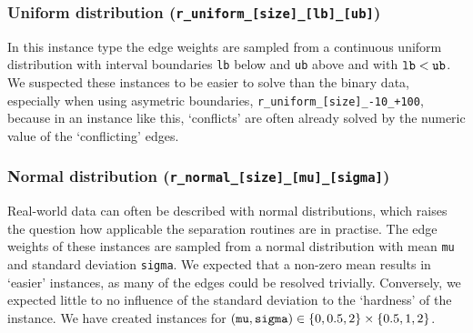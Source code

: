 \subsubsection{Uniform distribution (\texttt{r\_uniform\_[size]\_[lb]\_[ub]})}\label{subsubsec:data_random_uniform}
In this instance type the edge weights are sampled from a continuous uniform distribution with interval boundaries \texttt{lb} below and \texttt{ub} above and with $\text{\texttt{lb}} < \text{\texttt{ub}}$.
We suspected these instances to be easier to solve than the binary data, especially when using asymetric boundaries, \eg \texttt{r\_uniform\_[size]\_-10\_+100}, because in an instance like this, ‘conflicts’ are often already solved by the numeric value of the ‘conflicting’ edges.

\subsubsection{Normal distribution (\texttt{r\_normal\_[size]\_[mu]\_[sigma]})}\label{subsubsec:data_random_normal}
Real-world data can often be described with normal distributions, which raises the question how applicable the separation routines are in practise.
The edge weights of these instances are sampled from a normal distribution with mean \texttt{mu} and standard deviation \texttt{sigma}.
We expected that a non-zero mean results in ‘easier’ instances, as many of the edges could be resolved trivially.
Conversely, we expected little to no influence of the standard deviation to the ‘hardness’ of the instance.
We have created instances for $(\text{\texttt{mu}}, \text{\texttt{sigma}}) \in \left\{ 0, 0.5, 2 \right\} \times \left\{ 0.5, 1, 2 \right\}$.

